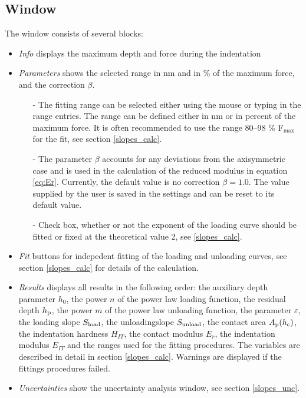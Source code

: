 \subsection{Window}
The window consists of several blocks:
\begin{itemize}
 \item \emph{Info} displays the maximum depth and force during the indentation
 \item \emph{Parameters} shows the selected range in nm and in \% of the maximum force, and the correction $\beta$. 
        \begin{itemize}
          \item[-] The fitting range can be selected either using the mouse or typing in the range entries. The range can be defined either in nm or in percent of the maximum force. 
                   It is often recommended to use the range 80--98 \% F$_\mathrm{max}$ for the fit, see section \ref{slopes_calc}.  
          \item[-] The parameter $\beta$ accounts for any deviations from the axisymmetric case and is used in the calculation of the reduced modulus in equation \eqref{eq:Er}. 
                   Currently, the default value is no correction $\beta = 1.0$. The value supplied by the user is saved in the settings and can be reset to its default value.
          \item[-] Check box, whether or not the exponent of the loading curve should be fitted or fixed at the theoretical value 2, see \ref{slopes_calc}.
          \end{itemize}
 \item \emph{Fit} buttons for indepedent fitting of the loading and unloading curves, see section \ref{slopes_calc} for details of the calculation.
 \item \emph{Results} displays all results in the following order: 
       the auxiliary depth parameter $h_0$, the power $n$ of the power law loading function, 
       the residual depth $h_\mathrm{p}$, the power $m$ of the power law unloading function, the parameter $\varepsilon$, 
       the loading slope $S_{\mathrm{load}}$, the unloadingslope $S_{\mathrm{unload}}$, 
       the contact area $A_\mathrm{p}(h_\mathrm{c})$, the indentation hardness $H_{IT}$, the contact modulus $E_r$, the indentation modulus $E_{IT}$ and the ranges used for the fitting procedures.
       The variables are described in detail in section \ref{slopes_calc}. Warnings are displayed if the fittings procedures failed.
 \item \emph{Uncertainties} show the uncertainty analysis window, see section \ref{slopes_unc}.

\end{itemize}
